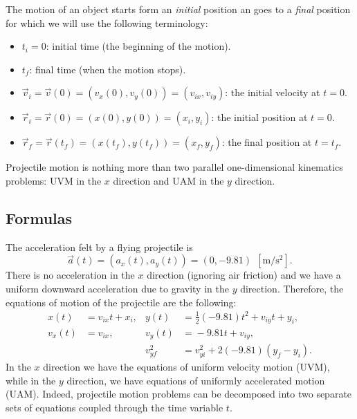 \documentclass[letterpaper,9pt,journal]{IEEEtran}
\begin{document}
The motion of an object starts form an \emph{initial} position an goes to a 
\emph{final} position for which we will use the following terminology:

\begin{itemize}
\item  $t_i=0$: initial time (the beginning of the motion).
\item  $t_f$: final time (when the motion stops).
\item  $\vec{v}_{i}=\vec{v}(0)=(v_x(0),v_y(0))=(v_{ix},v_{iy})$: the initial velocity at $t=0$.
\item  $\vec{r}_i=\vec{r}(0)=(x(0),y(0))=(x_i,y_i)$: the initial position at $t=0$.
\item  $\vec{r}_f=\vec{r}(t_f)=(x(t_f),y(t_f))=(x_f,y_f)$: the final position at $t=t_f$.
\end{itemize}


Projectile motion is nothing more than two parallel one-dimensional 
kinematics problems:  UVM in the $x$ direction and UAM in the $y$ direction.

\vspace{-3mm}
\subsection{Formulas}
\label{51d24e1edefe34e683025dbba5c6eed6}%

The acceleration felt by a flying projectile is
\[ 
 \vec{a}(t) = %
  (a_x(t),a_y(t)) = (0,-9.81) \ \ [\text{m}/\text{s}^2].
\]
There is no acceleration in the $x$ direction (ignoring air friction) and we have
a uniform downward acceleration due to gravity in the $y$ direction.
Therefore, the equations of motion of the projectile are the following:
\begin{align*}
 x(t)     &\! =\!  v_{ix}t + x_i,  	 & 	y(t) &\!=\! \frac{1}{2}(-9.81)t^2 + v_{iy}t + y_i, \\
 v_x(t) & \!=\!  v_{ix},		  & 	v_y(t)  &\!=\! -9.81 t + v_{iy},  \\
 & 							&	v_{yf}^2 & \!=\!  v_{yi}^2 + 2(-9.81)(y_f - y_i).
\end{align*}
In the $x$ direction we have the equations of uniform velocity motion (UVM),
while in the $y$ direction, we have equations of uniformly accelerated motion (UAM).
Indeed, projectile motion problems can be decomposed into two separate sets of equations
coupled through the time variable $t$.
\end{document}
